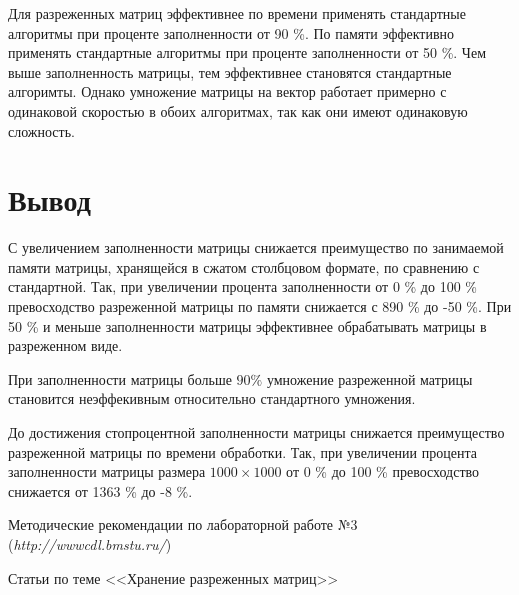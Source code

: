 \documentclass[a4paper,12pt]{extarticle}
\begin{document}
Для разреженных матриц эффективнее по времени применять стандартные алгоритмы при проценте заполненности от 90 \%. По памяти эффективно применять стандартные алгоритмы при проценте заполненности от 50 \%. Чем выше заполненность матрицы, тем эффективнее становятся стандартные алгоримты. Однако умножение матрицы на вектор работает примерно с одинаковой скоростью в обоих алгоритмах, так как они имеют одинаковую сложность.

\newpage

\section{Вывод}

С увеличением заполненности матрицы снижается преимущество по занимаемой памяти матрицы, хранящейся в сжатом столбцовом формате, по сравнению с стандартной. Так, при увеличении процента заполненности от 0 \% до 100 \% превосходство разреженной матрицы по памяти снижается с 890 \% до -50 \%. При 50 \% и меньше заполненности матрицы эффективнее обрабатывать матрицы в разреженном виде.

При заполненности матрицы больше $90 \%$ умножение разреженной матрицы становится неэффекивным относительно стандартного умножения.

До достижения стопроцентной заполненности матрицы снижается преимущество разреженной матрицы по времени обработки. Так, при увеличении процента заполненности матрицы размера $1000 \times 1000$ от 0 \% до 100 \% превосходство снижается от 1363 \% до -8 \%.

\newpage
\begin{thebibliography}{2}
Методические рекомендации по лабораторной работе №3 (\emph{http://wwwcdl.bmstu.ru/}) 

Статьи по теме <<Хранение разреженных матриц>>
\end{thebibliography}
\end{document}
